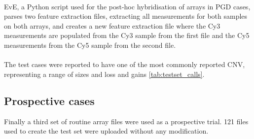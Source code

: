 \paragraph*{}
EvE, a Python script used for the post-hoc hybridisation of arrays in \ac{PGD} cases, parses two feature extraction files, extracting all measurements for both samples on both arrays, and creates a new feature extraction file where the Cy3 measurements are populated from the Cy3 sample from the first file and the Cy5 measurements from the Cy5 sample from the second file.

\paragraph*{}
The test cases were reported to have one of the most commonly reported CNV, representing a range of sizes and loss and gains \ref{tab:testset_calls}.

\begin{table}
\caption{Cases with one of the 9 most common CNV were used to create the test set}
\label{tab:testset_calls}
\end{table}

\subsection{Prospective cases}
Finally a third set of routine array files were used as a prospective trial. 
121 files used to create the test set were uploaded without any modification.

